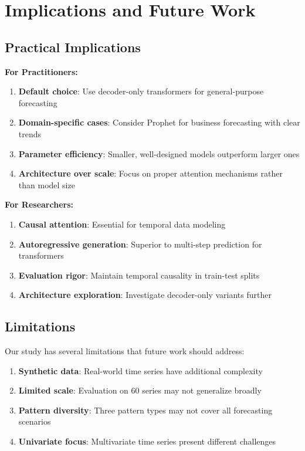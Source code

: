 \documentclass[11pt]{article}
\begin{document}
\section{Implications and Future Work}

\subsection{Practical Implications}

\textbf{For Practitioners:}
\begin{enumerate}
\item \textbf{Default choice}: Use decoder-only transformers for general-purpose forecasting
\item \textbf{Domain-specific cases}: Consider Prophet for business forecasting with clear trends
\item \textbf{Parameter efficiency}: Smaller, well-designed models outperform larger ones
\item \textbf{Architecture over scale}: Focus on proper attention mechanisms rather than model size
\end{enumerate}

\textbf{For Researchers:}
\begin{enumerate}
\item \textbf{Causal attention}: Essential for temporal data modeling
\item \textbf{Autoregressive generation}: Superior to multi-step prediction for transformers
\item \textbf{Evaluation rigor}: Maintain temporal causality in train-test splits
\item \textbf{Architecture exploration}: Investigate decoder-only variants further
\end{enumerate}

\subsection{Limitations}

Our study has several limitations that future work should address:
\begin{enumerate}
\item \textbf{Synthetic data}: Real-world time series have additional complexity
\item \textbf{Limited scale}: Evaluation on 60 series may not generalize broadly  
\item \textbf{Pattern diversity}: Three pattern types may not cover all forecasting scenarios
\item \textbf{Univariate focus}: Multivariate time series present different challenges
\end{enumerate}
\end{document}
